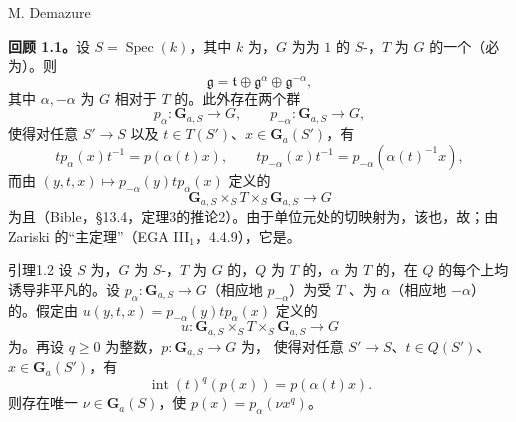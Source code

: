 \begin{center}M. Demazure\end{center}
\textbf{回顾 1.1。}设 $S=\operatorname{Spec}(k)$，其中 $k$ 为，$G$ 为为 $1$ 的 $S$-，$T$ 为 $G$ 的一个（必为）。则
\[\mathfrak g=\mathfrak t\oplus\mathfrak g^\alpha\oplus\mathfrak g^{-\alpha},\]
其中 $\alpha,-\alpha$ 为 $G$ 相对于 $T$ 的。此外存在两个群
\[p_\alpha:\mathbf G_{a,S}\longrightarrow G,\qquad p_{-\alpha}:\mathbf G_{a,S}\longrightarrow G,\]
使得对任意 $S'\to S$ 以及 $t\in T(S')$、$x\in\mathbf G_a(S')$，有
\[t p_\alpha(x)t^{-1}=p(\alpha(t)x),\qquad t p_{-\alpha}(x)t^{-1}=p_{-\alpha}(\alpha(t)^{-1}x),\]
而由 $(y,t,x)\mapsto p_{-\alpha}(y)t p_\alpha(x)$ 定义的
\[\mathbf G_{a,S}\times_S T\times_S\mathbf G_{a,S}\longrightarrow G\]
为且（Bible，§13.4，定理3的推论2）。由于单位元处的切映射为，该也，故；由 Zariski 的“主定理”（EGA III$_1$，4.4.9），它是。
\begin{SGAresult}{引理}{1.2}
设 $S$ 为，$G$ 为 $S$-，$T$ 为 $G$ 的，$Q$ 为 $T$ 的，$\alpha$ 为 $T$ 的，在 $Q$ 的每个上均诱导非平凡的。设 $p_\alpha:\mathbf G_{a,S}\to G$（相应地 $p_{-\alpha}$）为受 $T$ 、为 $\alpha$（相应地 $-\alpha$）的。假定由 $u(y,t,x)=p_{-\alpha}(y)t p_\alpha(x)$ 定义的
\[u:\mathbf G_{a,S}\times_S T\times_S\mathbf G_{a,S}\longrightarrow G\]
为。再设 $q\geq0$ 为整数，$p:\mathbf G_{a,S}\to G$ 为，
使得对任意 $S'\to S$、$t\in Q(S')$、$x\in\mathbf G_a(S')$，有
\[\operatorname{int}(t)^q(p(x))=p(\alpha(t)x).\]
则存在唯一 $\nu\in\mathbf G_a(S)$，使 $p(x)=p_\alpha(\nu x^q)$。
\end{SGAresult}
